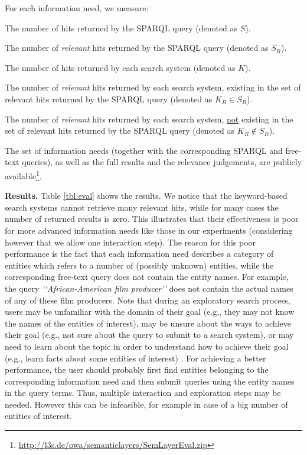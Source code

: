 \documentclass{libtex/sig-alternate-05-2015}
\newcommand{\q}[1]{\lq\lq{}{}#1\rq\rq{}{}}
\begin{document}
For each information need, we measure:
\begin{compactitem}
\item   The number of hits returned by the SPARQL query (denoted as $S$).
\item   The number of {\em relevant} hits returned by the SPARQL query (denoted as $S_R$).
\item   The number of hits returned by each search system (denoted as $K$).
\item   The number of {\em relevant} hits returned by each search system,
        existing in the set of relevant hits returned by the SPARQL query (denoted as $K_{R} \in S_R$).
\item   The number of {\em relevant} hits returned by each search system,
         \underline{not} existing in the set of relevant hits returned by the SPARQL query (denoted as $K_{R} \notin S_R$).
\end{compactitem}
\vspace{0.5mm}
The set of information needs (together with the corresponding SPARQL and free-text queries),
as well as the full results and the relevance judgements,
are publicly available\footnote{\url{http://l3s.de/owa/semanticlayers/SemLayerEval.zip}}.


\vspace{1mm} \noindent
{\bf Results.}
Table \ref{tbl:eval} shows the results.
We notice that the keyword-based search systems
cannot retrieve many relevant hits, while for many cases
the number of returned results is zero.
This illustrates that their effectiveness is
poor for more advanced information needs like those in our experiments
(considering however that we allow one interaction step).
The reason for this poor performance is the fact that each information
need describes a category of entities which refers to a number of
(possibly unknown) entities,
while the corresponding free-text query does not contain the entity names.
For example, the query {\em \q{African-American film producer}}
does not contain the actual names of any of these film producers.
Note that during an exploratory search process,
users may be unfamiliar with the domain of their goal
(e.g., they may not know the names of the entities of interest),
may be unsure about the ways to achieve their goal (e.g., not sure about the query to submit
to a search system),
or may need to learn about the topic in order to understand how to achieve their
goal (e.g., learn facts about some entities of interest) \cite{marchionini2006exploratory}.
For achieving a better performance, the user should probably
first find entities belonging to the corresponding information need and
then submit queries using the entity names in the query terms.
Thus, multiple interaction and exploration steps may be needed.
However this can be infeasible, for example in case
of a big number of entities of interest.
\end{document}
